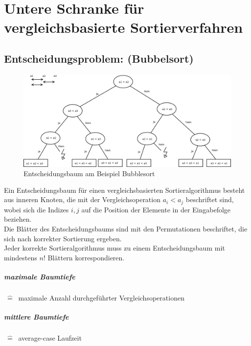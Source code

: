 
\chapter{Untere Schranke für vergleichsbasierte Sortierverfahren}
\section{Entscheidungsproblem: (Bubbelsort)}
\begin{figure}[h]
	\centering
\includegraphics[width=\linewidth]{08/Grafik/img2.png}
\caption{Entscheidungsbaum am Beispiel Bubblesort}
\end{figure}


Ein Entscheidungsbaum für einen vergleichsbasierten Sortieralgorithmus besteht aus inneren Knoten, die mit der Vergleichsoperation $a_i < a_j$ beschriftet sind, wobei sich die Indizes $i,j$ auf die Position der Elemente in der Eingabefolge beziehen.\\
Die Blätter des Entscheidungsbaums sind mit den Permutationen beschriftet, die sich nach korrekter Sortierung ergeben.\\
Jeder korrekte Sortieralgorithmus muss zu einem Entscheidungsbaum mit mindestens $n!$ Blättern korrespondieren.\\
\paragraph{maximale Baumtiefe} $~\hat{=}~$ maximale Anzahl durchgeführter Vergleichsoperationen\\
\paragraph{mittlere Baumtiefe} $~\hat{=}~$ average-case Laufzeit
